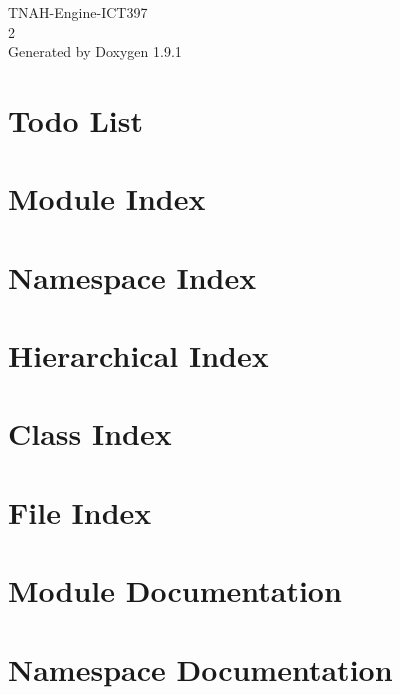 \let\mypdfximage\pdfximage\def\pdfximage{\immediate\mypdfximage}\documentclass[twoside]{book}
\newcommand{\+}{\discretionary{\mbox{\scriptsize$\hookleftarrow$}}{}{}}
\newcommand{\clearemptydoublepage}{%
  \newpage{\pagestyle{empty}\cleardoublepage}%
}
\begin{document}
\raggedbottom

\hypersetup{pageanchor=false,
             bookmarksnumbered=true,
             pdfencoding=unicode
            }
\begin{titlepage}
\vspace*{7cm}
\begin{center}%
{\Large TNAH-\/\+Engine-\/\+ICT397 \\[1ex]\large 2 }\\
\vspace*{1cm}
{\large Generated by Doxygen 1.9.1}\\
\end{center}
\end{titlepage}
\clearemptydoublepage
{}
\tableofcontents
\clearemptydoublepage
{}
\hypersetup{pageanchor=true}

\chapter{Todo List}
\label{todo}

\chapter{Module Index}

\chapter{Namespace Index}

\chapter{Hierarchical Index}

\chapter{Class Index}

\chapter{File Index}

\chapter{Module Documentation}


\chapter{Namespace Documentation}


\end{document}
